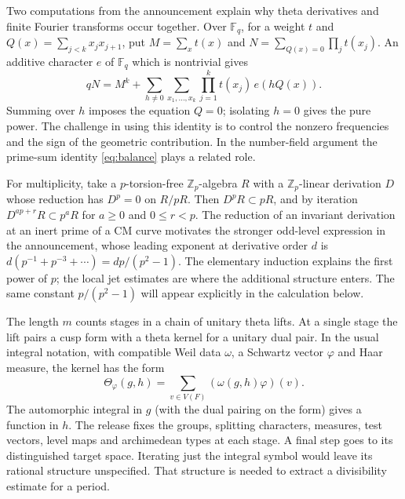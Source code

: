 \documentclass[11pt,a4paper]{article}
\theoremstyle{definition}\newtheorem{arithinput}[theorem]{Arithmetic input}
\begin{document}
Two computations from the announcement explain why theta derivatives and finite Fourier transforms occur together. Over $\mathbb F_q$, for a weight $t$ and $Q(x)=\sum_{j<k}x_jx_{j+1}$, put $M=\sum_x t(x)$ and $N=\sum_{Q(x)=0}\prod_j t(x_j)$. An additive character $e$ of $\mathbb F_q$ which is nontrivial gives
\[
 qN=M^k+\sum_{h\ne0}\sum_{x_1,\ldots,x_k}\prod_{j=1}^k t(x_j)\,e(hQ(x)).
\]
Summing over $h$ imposes the equation $Q=0$; isolating $h=0$ gives the pure power. The challenge in using this identity is to control the nonzero frequencies and the sign of the geometric contribution. In the number-field argument the prime-sum identity \eqref{eq:balance} plays a related role.

For multiplicity, take a $p$-torsion-free $\mathbb Z_p$-algebra $R$ with a $\mathbb Z_p$-linear derivation $D$ whose reduction has $D^p=0$ on $R/pR$. Then $D^p R\subset pR$, and by iteration $D^{ap+r}R\subset p^aR$ for $a\ge0$ and $0\le r<p$. The reduction of an invariant derivation at an inert prime of a CM curve motivates the stronger odd-level expression in the announcement, whose leading exponent at derivative order $d$ is $d(p^{-1}+p^{-3}+\cdots)=dp/(p^2-1)$. The elementary induction explains the first power of $p$; the local jet estimates are where the additional structure enters. The same constant $p/(p^2-1)$ will appear explicitly in the calculation below.

The length $m$ counts stages in a chain of unitary theta lifts. At a single stage the lift pairs a cusp form with a theta kernel for a unitary dual pair. In the usual integral notation, with compatible Weil data $\omega$, a Schwartz vector $\varphi$ and Haar measure, the kernel has the form
\[
 \Theta_\varphi(g,h)=\sum_{v\in V(F)}(\omega(g,h)\varphi)(v).
\]
The automorphic integral in $g$ (with the dual pairing on the form) gives a function in $h$. The release fixes the groups, splitting characters, measures, test vectors, level maps and archimedean types at each stage. A final step goes to its distinguished target space. Iterating just the integral symbol would leave its rational structure unspecified. That structure is needed to extract a divisibility estimate for a period.
\end{document}
